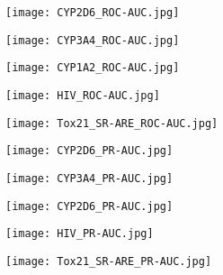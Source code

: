 \documentclass{article}
\begin{document}
\begin{figure}[htbp]


  \begin{minipage}[b]{0.322\linewidth}
    \centering
    \texttt{[image: CYP2D6\_ROC-AUC.jpg]}
    \label{CYP2D6_ROC-AUC}
  \end{minipage}
  \begin{minipage}[b]{0.322\linewidth}
    \centering
    \texttt{[image: CYP3A4\_ROC-AUC.jpg]}
    \label{CYP3A4_ROC-AUC}
  \end{minipage}
  \begin{minipage}[b]{0.322\linewidth}
    \centering
    \texttt{[image: CYP1A2\_ROC-AUC.jpg]}
    \label{CYP1A2_ROC-AUC}
  \end{minipage}
  
  \begin{minipage}[b]{0.322\linewidth}
    \centering
    \texttt{[image: HIV\_ROC-AUC.jpg]}
    \label{HIV_ROC-AUC}
  \end{minipage}
  \begin{minipage}[b]{0.322\linewidth}
    \centering
    \texttt{[image: Tox21\_SR-ARE\_ROC-AUC.jpg]}
    \label{SR-ARE_ROC-AUC}
  \end{minipage}
  
  \begin{minipage}[b]{0.322\linewidth}
    \centering
    \texttt{[image: CYP2D6\_PR-AUC.jpg]}
    \label{CYP2D6_PR-AUC}
  \end{minipage}
  \begin{minipage}[b]{0.322\linewidth}
    \centering
    \texttt{[image: CYP3A4\_PR-AUC.jpg]}
    \label{CYP3A4_PR-AUC}
  \end{minipage}
  \begin{minipage}[b]{0.322\linewidth}
    \centering
    \texttt{[image: CYP2D6\_PR-AUC.jpg]}
    \label{CYP1A2_PR-AUC}
  \end{minipage}

  \begin{minipage}[b]{0.322\linewidth}
    \centering
    \texttt{[image: HIV\_PR-AUC.jpg]}
    \label{HIV_PR-AUC}
  \end{minipage}
  \begin{minipage}[b]{0.322\linewidth}
    \centering
    \texttt{[image: Tox21\_SR-ARE\_PR-AUC.jpg]}
    \label{SR-ARE_PR-AUC}
  \end{minipage}


\end{figure}
\end{document}
